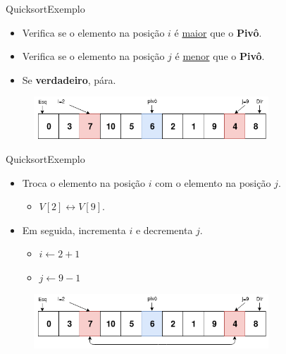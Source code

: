 \documentclass[aspectratio=169]{beamer}
\begin{document}

\begin{frame}{Quicksort}{Exemplo}
\begin{itemize}
 \item Verifica se o elemento na posição $i$ é \underline{maior} que o {\bf Pivô}.
 \item Verifica se o elemento na posição $j$ é \underline{menor} que o {\bf Pivô}.
 \item Se {\bf verdadeiro}, pára.
\end{itemize}

\begin{figure}[!h]
  \centering
  \includegraphics[width=250pt]{imgs/quick/quick6.png}
  \label{fig_quick6}
\end{figure}
\end{frame}


\begin{frame}{Quicksort}{Exemplo}
\begin{itemize}
 \item Troca o elemento na posição $i$ com o elemento na posição $j$.
 \begin{itemize}
 \item $V[2] \leftrightarrow V[9]$.
 \end{itemize}
 \item Em seguida, incrementa $i$ e decrementa $j$.
 \begin{itemize}
 \item $i \leftarrow 2 + 1$
 \item $j \leftarrow 9 - 1$ 
 \end{itemize} 
\end{itemize}

\begin{figure}[!h]
  \centering
  \includegraphics[width=250pt]{imgs/quick/quick7.png}
  \label{fig_quick7}
\end{figure}
\end{frame}
\end{document}
